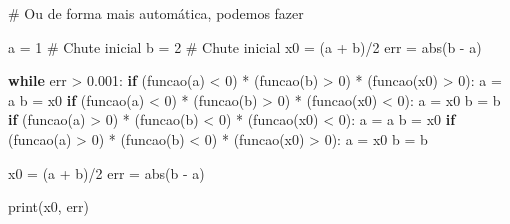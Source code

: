 \documentclass[
  letterpaper,
  DIV=11,
  numbers=noendperiod]{scrreprt}
\newenvironment{Shaded}{\begin{snugshade}}{\end{snugshade}}
\newcommand{\BuiltInTok}[1]{\textcolor[rgb]{0.00,0.23,0.31}{#1}}
\newcommand{\CommentTok}[1]{\textcolor[rgb]{0.37,0.37,0.37}{#1}}
\newcommand{\ControlFlowTok}[1]{\textcolor[rgb]{0.00,0.23,0.31}{\textbf{#1}}}
\newcommand{\DecValTok}[1]{\textcolor[rgb]{0.68,0.00,0.00}{#1}}
\newcommand{\FloatTok}[1]{\textcolor[rgb]{0.68,0.00,0.00}{#1}}
\newcommand{\NormalTok}[1]{\textcolor[rgb]{0.00,0.23,0.31}{#1}}
\newcommand{\OperatorTok}[1]{\textcolor[rgb]{0.37,0.37,0.37}{#1}}
\begin{document}
\begin{Shaded}
\begin{Highlighting}[]
\CommentTok{\# Ou de forma mais automática, podemos fazer}

\NormalTok{a }\OperatorTok{=} \DecValTok{1} \CommentTok{\# Chute inicial}
\NormalTok{b }\OperatorTok{=} \DecValTok{2} \CommentTok{\# Chute inicial}
\NormalTok{x0 }\OperatorTok{=}\NormalTok{ (a }\OperatorTok{+}\NormalTok{ b)}\OperatorTok{/}\DecValTok{2}
\NormalTok{err }\OperatorTok{=} \BuiltInTok{abs}\NormalTok{(b }\OperatorTok{{-}}\NormalTok{ a)}

\ControlFlowTok{while}\NormalTok{ err }\OperatorTok{\textgreater{}} \FloatTok{0.001}\NormalTok{:}
    \ControlFlowTok{if}\NormalTok{ (funcao(a) }\OperatorTok{\textless{}} \DecValTok{0}\NormalTok{) }\OperatorTok{*}\NormalTok{ (funcao(b) }\OperatorTok{\textgreater{}} \DecValTok{0}\NormalTok{) }\OperatorTok{*}\NormalTok{ (funcao(x0) }\OperatorTok{\textgreater{}} \DecValTok{0}\NormalTok{):}
\NormalTok{        a }\OperatorTok{=}\NormalTok{ a}
\NormalTok{        b }\OperatorTok{=}\NormalTok{ x0}
    \ControlFlowTok{if}\NormalTok{ (funcao(a) }\OperatorTok{\textless{}} \DecValTok{0}\NormalTok{) }\OperatorTok{*}\NormalTok{ (funcao(b) }\OperatorTok{\textgreater{}} \DecValTok{0}\NormalTok{) }\OperatorTok{*}\NormalTok{ (funcao(x0) }\OperatorTok{\textless{}} \DecValTok{0}\NormalTok{):}
\NormalTok{        a }\OperatorTok{=}\NormalTok{ x0}
\NormalTok{        b }\OperatorTok{=}\NormalTok{ b}
    \ControlFlowTok{if}\NormalTok{ (funcao(a) }\OperatorTok{\textgreater{}} \DecValTok{0}\NormalTok{) }\OperatorTok{*}\NormalTok{ (funcao(b) }\OperatorTok{\textless{}} \DecValTok{0}\NormalTok{) }\OperatorTok{*}\NormalTok{ (funcao(x0) }\OperatorTok{\textless{}} \DecValTok{0}\NormalTok{):}
\NormalTok{        a }\OperatorTok{=}\NormalTok{ a}
\NormalTok{        b }\OperatorTok{=}\NormalTok{ x0}
    \ControlFlowTok{if}\NormalTok{ (funcao(a) }\OperatorTok{\textgreater{}} \DecValTok{0}\NormalTok{) }\OperatorTok{*}\NormalTok{ (funcao(b) }\OperatorTok{\textless{}} \DecValTok{0}\NormalTok{) }\OperatorTok{*}\NormalTok{ (funcao(x0) }\OperatorTok{\textgreater{}} \DecValTok{0}\NormalTok{):}
\NormalTok{        a }\OperatorTok{=}\NormalTok{ x0}
\NormalTok{        b }\OperatorTok{=}\NormalTok{ b}

\NormalTok{    x0 }\OperatorTok{=}\NormalTok{ (a }\OperatorTok{+}\NormalTok{ b)}\OperatorTok{/}\DecValTok{2}
\NormalTok{    err }\OperatorTok{=} \BuiltInTok{abs}\NormalTok{(b }\OperatorTok{{-}}\NormalTok{ a)}
    
\BuiltInTok{print}\NormalTok{(x0, err)}
\end{Highlighting}
\end{Shaded}
\end{document}
